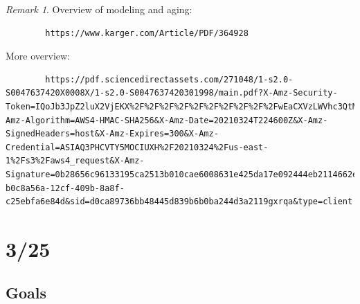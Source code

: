 \documentclass[11pt]{article}
\theoremstyle{remark}
\newtheorem{remark}{Remark}
\begin{document}
\begin{remark}
	Overview of modeling and aging:
	\begin{verbatim}
		https://www.karger.com/Article/PDF/364928
	\end{verbatim}
	More overview:
	\begin{verbatim}
		https://pdf.sciencedirectassets.com/271048/1-s2.0-S0047637420X0008X/1-s2.0-S0047637420301998/main.pdf?X-Amz-Security-Token=IQoJb3JpZ2luX2VjEKX%2F%2F%2F%2F%2F%2F%2F%2F%2F%2FwEaCXVzLWVhc3QtMSJHMEUCIQDtxztxTwmt1nAHIetcwl5tOV2MZbGwFF56V7zoK6XVxQIgAkcb3BUqITM4HPBHOtLAOi9i%2FY%2FSo1%2BSjgXREYBMLm4qvQMI3v%2F%2F%2F%2F%2F%2F%2F%2F%2F%2FARADGgwwNTkwMDM1NDY4NjUiDCs1pQ002Z9lSlmuQiqRA3ay0yM21QIS6bB0hmMSKiDonsywWZu0lvSN3nZb7c0szS3gOTGII6BrhavOViCecYMA4aTf%2BQmW6i57XLAL%2Fg%2FXf6wKHLXKqv0hU7XF1nZZlNHmuOVH7oBcWCwej8ZcjJIyfuEl4i0Iaog836gSpNx7bx6L%2BH6IohP27WxcDTL1NNCc49guVd8uuK4bYe0newZpfUJfOlnlQ%2Fsc%2BRzIjWC3n3%2FVvwW4kwFfbQYwJc%2FemATL5eTMNnZvrJ9aRa3M4QKXJHrvTB2cV9y5ut%2FQ8s1mnYgJOKwF6lIekrdT48fGVfVkKEQXu%2FXOyWZnDLY9Y8neQEgwFLHKV0DadwqjE78ApIZSi9k%2FSOoo%2BNEPW60DZAQcaiFPeQ55ZOntIIlokXZtGN%2FoWlMbR0zmLwKM94305XfqtYQSo%2Fsd2bhrgNKOrTOMKANSXnRYLS%2F2QrmFPYnZyWYmIrH0xVK9syTcrVQ9VBgcM0Ex57VJ2ZsLP3sVM%2FNYjrWVOs60fHNsVVtv8yqigGmAAic5efRPh34mZtduMMrS7oIGOusB%2BhnkKNSrh49bXSPVMwtT9Paw%2F9agOjWQYogGoIHGgpFoJaoZSI66FWHsdnOWhHs4%2F9vNKyIEsQHdiGebh8dAxlA%2FFb51TTNiBS2ud66tkqTYGxb%2FPHw7qv1qoYYQoX69E1rwQ5IuRxg65RvyPQ3tKkDAXvmaZxzCdz6mZirlSqKrzG9Wo8f%2B1MZoW2D2iIsZBRXsfgRLz2ZGpATgSkEw9tjXh1yvtAPF5D1GqJwFt1suMtKFFh0dB2eYSdRp0VQ1lpLgU%2Bu1ibAS%2BH%2BWT52GQ%2Fy2LbA8%2BpUK9fLbUJV4l3w5i8rOo7kzpaBMYQ%3D%3D&X-Amz-Algorithm=AWS4-HMAC-SHA256&X-Amz-Date=20210324T224600Z&X-Amz-SignedHeaders=host&X-Amz-Expires=300&X-Amz-Credential=ASIAQ3PHCVTY5MOCIUXH%2F20210324%2Fus-east-1%2Fs3%2Faws4_request&X-Amz-Signature=0b28656c96133195ca2513b010cae6008631e425da17e092444eb2114662ed12&hash=73c0540d95dce1a910b53ce0a092c048ccde822e391807a6cfa179ae183dea6b&host=68042c943591013ac2b2430a89b270f6af2c76d8dfd086a07176afe7c76c2c61&pii=S0047637420301998&tid=spdf-b0c8a56a-12cf-409b-8a8f-c25ebfa6e84d&sid=d0ca89736bb48445d839b6b0ba244d3a2119gxrqa&type=client
	\end{verbatim}
\end{remark}

\section{3/25}

\subsection{Goals}
\end{document}
